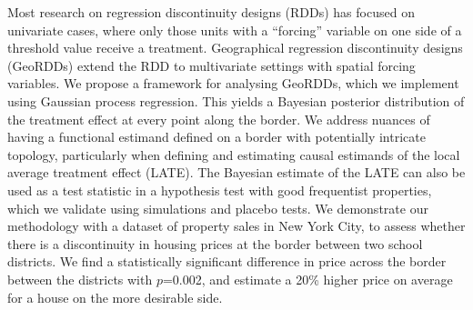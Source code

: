 Most research on regression discontinuity designs (RDDs) has focused on univariate cases, where only those units with a ``forcing'' variable on one side of a threshold value receive a treatment.
Geographical regression discontinuity designs (GeoRDDs) extend the RDD to multivariate settings with spatial forcing variables.
We propose a framework for analysing GeoRDDs, which we implement using Gaussian process regression. 
This yields a Bayesian posterior distribution of the treatment effect at every point along the border.
We address nuances of having a functional estimand defined on a border with potentially intricate topology, particularly when defining and estimating causal estimands of the local average treatment effect (LATE).
The Bayesian estimate of the LATE can also be used as a test statistic
in a hypothesis test with good frequentist properties, 
which we validate using simulations and placebo tests.
We demonstrate our methodology with a dataset of property sales in New York City,
to assess whether there is a discontinuity in housing prices at the border between two school districts.
We find a statistically significant difference in price across the border between the districts with \(p\)=0.002, and estimate a 20\%  higher price on average for a house on the more desirable side.
